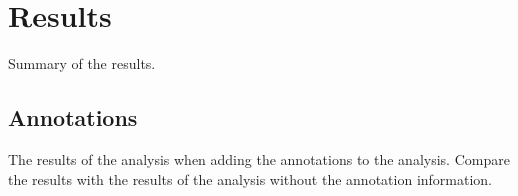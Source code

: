 \documentclass[main.tex]{subfiles}
\begin{document}
    \chapter{Results}\label{chap:results}
    Summary of the results.
    
    \section{Annotations}
    The results of the analysis when adding the annotations to the analysis. Compare the results with the results of the analysis without the annotation information.

    
\end{document}
